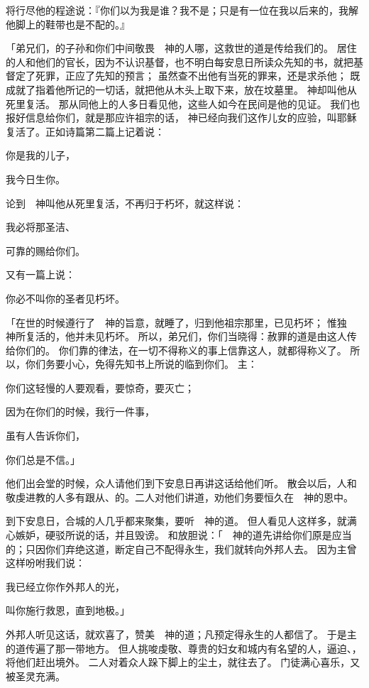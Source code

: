 {将行尽他的程途说：『你们以为我是谁？我不是{}；只是有一位在我以后来的，我解他脚上的鞋带也是不配的。』
\par }{\PP {}「弟兄们，{}的子孙和你们中间敬畏　神的人哪，这救世的道是传给我们的。
居住的人和他们的官长，因为不认识基督，也不明白每安息日所读众先知的书，就把基督定了死罪，正应了先知的预言；
虽然查不出他有当死的罪来，还是求{}杀他；
既成就了{}指着他所记的一切话，就把他从木头上取下来，放在坟墓里。
神却叫他从死里复活。
那从{}同他上{}的人多日看见他，这些人如今在民间是他的见证。
我们也报好信息给你们，就是那应许祖宗的话，
神已经向我们这作儿女的应验，叫耶稣复活了。正如诗篇第二篇上记着说：
\par }{\Q 你是我的儿子，
\par }{\Q 我今日生你。
\par }{\MM {}论到　神叫他从死里复活，不再归于朽坏，就这样说：
\par }{\Q 我必将{}{}那圣洁、
\par }{\Q 可靠的{}赐给你们。
\par }{\Q {}又有一篇上说：
\par }{\Q 你必不叫你的圣者见朽坏。
\par }{\PP {}「{}在世的时候遵行了　神的旨意，就睡了，归到他祖宗那里，已见朽坏；
惟独　神所复活的，他并未见朽坏。
所以，弟兄们，你们当晓得：赦罪的道是由这人传给你们的。
你们靠{}的律法，在一切不得称义的事上信靠这人，就都得称义了。
所以，你们务要小心，免得先知书上所说的临到你们。
主{}：
\par }{\Q 你们这轻慢的人要观看，要惊奇，要灭亡；
\par }{\Q 因为在你们的时候，我行一件事，
\par }{\Q 虽有人告诉你们，
\par }{\Q 你们总是不信。」
\par }{\PP {}他们出会堂的时候，众人请他们到下安息日再讲这话给他们听。
散会以后，{}人和敬虔进{}教的人多有跟从{}、{}的。二人对他们讲道，劝他们务要恒久在　神的恩中。
\par }{\PP {}到下安息日，合城的人几乎都来聚集，要听　神的道。
但{}人看见人这样多，就满心嫉妒，硬驳{}所说的话，并且毁谤。
和{}放胆说：「　神的道先讲给你们原是应当的；只因你们弃绝这道，断定自己不配得永生，我们就转向外邦人去。
因为主曾这样吩咐我们说：
\par }{\Q 我已经立你作外邦人的光，
\par }{\Q 叫你施行救恩，直到地极。」
\par }{\PP {}外邦人听见这话，就欢喜了，赞美　神的道；凡预定得永生的人都信了。
于是主的道传遍了那一带地方。
但{}人挑唆虔敬、尊贵的妇女和城内有名望的人，逼迫{}、{}，将他们赶出境外。
二人对着众人跺下脚上的尘土，就往{}去了。
门徒满心喜乐，又被圣灵充满。

}
